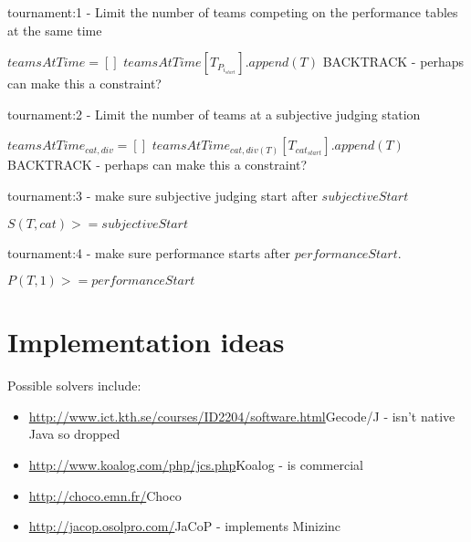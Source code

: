 \documentclass[letterpaper,11pt]{report}
\begin{document}
\begin{algorithm}
\caption{tournament:1 - Limit the number of teams competing on the performance tables at
  the same time}
\begin{algorithmic}

\STATE $teamsAtTime = []$
    \STATE $teamsAtTime[T_{P_{i_{start}}}].append(T)$
  \ENDFOR
      \STATE BACKTRACK - perhaps can make this a constraint?
    \ENDIF
  \ENDFOR
\ENDFOR

\end{algorithmic}
\end{algorithm}

\begin{algorithm}
\caption{tournament:2 - Limit the number of teams at a subjective judging station}
\begin{algorithmic}
    \STATE $teamsAtTime_{cat,div} = []$
  \ENDFOR
    \STATE $teamsAtTime_{cat,div(T)}[T_{cat_{start}}].append(T)$
  \ENDFOR
        \STATE BACKTRACK - perhaps can make this a constraint?
      \ENDIF
    \ENDFOR
  \ENDFOR
\ENDFOR
\end{algorithmic}
\end{algorithm}

\begin{algorithm}
\caption{tournament:3 - make sure subjective judging start after $subjectiveStart$}
\begin{algorithmic}
    \STATE $S(T, cat) >= subjectiveStart$
  \ENDFOR
\ENDFOR
\end{algorithmic}
\end{algorithm}

\begin{algorithm}
\caption{tournament:4 - make sure performance starts after
$performanceStart$.}
\begin{algorithmic}
  \STATE $P(T, 1) >= performanceStart$
\ENDFOR
\end{algorithmic}
\end{algorithm}

\FloatBarrier
\section{Implementation ideas}
Possible solvers include:
\begin{itemize}
\item \url{http://www.ict.kth.se/courses/ID2204/software.html}{Gecode/J} - isn't native Java so dropped
\item \url{http://www.koalog.com/php/jcs.php}{Koalog} - is commercial
\item \url{http://choco.emn.fr/}{Choco}
\item \url{http://jacop.osolpro.com/}{JaCoP} - implements Minizinc
\end{itemize}
\end{document}
